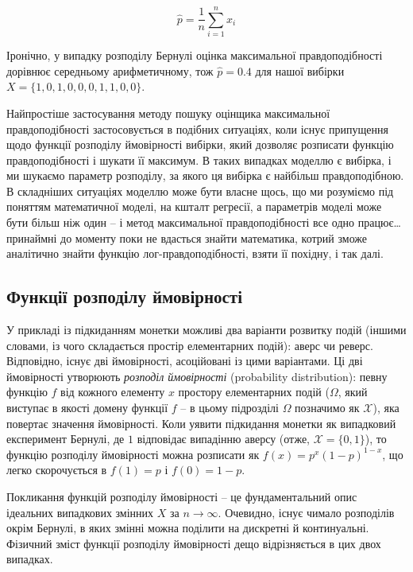 \documentclass[
  11pt,
]{book}
\begin{document}
\[\hat{p} = \frac{1}{n} \sum \limits_{i=1}^n x_i\]

Іронічно, у випадку розподілу Бернулі оцінка максимальної правдоподібності дорівнює середньому арифметичному, тож \(\hat{p} = 0.4\) для нашої вибірки \(X = \{1, 0, 1, 0, 0, 0, 1, 1, 0, 0\}\).

Найпростіше застосування методу пошуку оцінщика максимальної правдоподібності застосовується в подібних ситуаціях, коли існує припущення щодо функції розподілу ймовірності вибірки, який дозволяє розписати функцію правдоподібності і шукати її максимум. В таких випадках моделлю є вибірка, і ми шукаємо параметр розподілу, за якого ця вибірка є найбільш правдоподібною. В складніших ситуаціях моделлю може бути власне щось, що ми розуміємо під поняттям математичної моделі, на кшталт регресії, а параметрів моделі може бути більш ніж один -- і метод максимальної правдоподібності все одно працює\ldots{} принаймні до моменту поки не вдасться знайти математика, котрий зможе аналітично знайти функцію лог-правдоподібності, взяти її похідну, і так далі.

\subsection{Функції розподілу ймовірності}\label{pdfs}

У прикладі із підкиданням монетки можливі два варіанти розвитку подій (іншими словами, із чого складається простір елементарних подій): аверс чи реверс. Відповідно, існує дві ймовірності, асоційовані із цими варіантами. Ці дві ймовірності утворюють \emph{розподіл ймовірності} (probability distribution): певну функцію \(f\) від кожного елементу \(x\) простору елементарних подій (\(\Omega\), який виступає в якості домену функції \(f\) -- в цьому підрозділі \(\Omega\) позначимо як \(\mathcal{X}\)), яка повертає значення ймовірності. Коли уявити підкидання монетки як випадковий експеримент Бернулі, де \(1\) відповідає випадінню аверсу (отже, \(\mathcal{X} = \{0, 1\}\)), то функцію розподілу ймовірності можна розписати як \(f(x) = p^x (1-p)^{1-x}\), що легко скорочується в \(f(1) = p\) і \(f(0) = 1 - p\).

Покликання функцій розподілу ймовірності -- це фундаментальний опис ідеальних випадкових змінних \(X\) за \(n \rightarrow \infty\). Очевидно, існує чимало розподілів окрім Бернулі, в яких змінні можна поділити на дискретні й континуальні. Фізичний зміст функції розподілу ймовірності дещо відрізняється в цих двох випадках.
\end{document}
